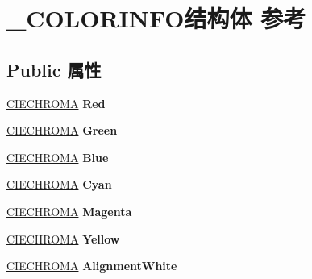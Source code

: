 \hypertarget{struct___c_o_l_o_r_i_n_f_o}{}\section{\+\_\+\+C\+O\+L\+O\+R\+I\+N\+F\+O结构体 参考}
\label{struct___c_o_l_o_r_i_n_f_o}
\subsection*{Public 属性}
\begin{DoxyCompactItemize}
\item 
\mbox{\label{struct___c_o_l_o_r_i_n_f_o_a7a2455ae7fcd8e11f37e3a1892ddff09}} 
\hyperlink{struct___c_i_e_c_h_r_o_m_a}{C\+I\+E\+C\+H\+R\+O\+MA} {\bfseries Red}
\item 
\mbox{\label{struct___c_o_l_o_r_i_n_f_o_a88730c371b39a8e718fc6cbbe2725f84}} 
\hyperlink{struct___c_i_e_c_h_r_o_m_a}{C\+I\+E\+C\+H\+R\+O\+MA} {\bfseries Green}
\item 
\mbox{\label{struct___c_o_l_o_r_i_n_f_o_a92bcbb0e603f829f555756d1beb47037}} 
\hyperlink{struct___c_i_e_c_h_r_o_m_a}{C\+I\+E\+C\+H\+R\+O\+MA} {\bfseries Blue}
\item 
\mbox{\label{struct___c_o_l_o_r_i_n_f_o_a0b8a82ae6ca570b19d15d4b69ab6b825}} 
\hyperlink{struct___c_i_e_c_h_r_o_m_a}{C\+I\+E\+C\+H\+R\+O\+MA} {\bfseries Cyan}
\item 
\mbox{\label{struct___c_o_l_o_r_i_n_f_o_a3c03224f60e449782cd5d780401ef640}} 
\hyperlink{struct___c_i_e_c_h_r_o_m_a}{C\+I\+E\+C\+H\+R\+O\+MA} {\bfseries Magenta}
\item 
\mbox{\label{struct___c_o_l_o_r_i_n_f_o_a99e365c7665917505f3d2b314b7440a9}} 
\hyperlink{struct___c_i_e_c_h_r_o_m_a}{C\+I\+E\+C\+H\+R\+O\+MA} {\bfseries Yellow}
\item 
\mbox{\label{struct___c_o_l_o_r_i_n_f_o_ad0fb9c7f93eaca65ccc9127842cc91f9}} 
\hyperlink{struct___c_i_e_c_h_r_o_m_a}{C\+I\+E\+C\+H\+R\+O\+MA} {\bfseries Alignment\+White}
\item 

\end{DoxyCompactItemize}
